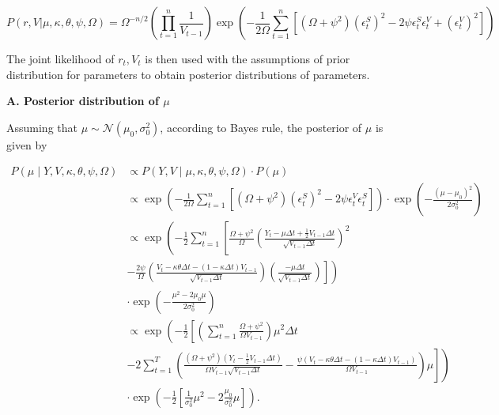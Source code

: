 \documentclass[12pt,a4paper]{article}
\numberwithin{equation}{section}
\begin{document}
\[
P(r, V| \mu, \kappa, \theta, \psi, \Omega) = \Omega^{-n/2} \left( \prod_{t=1}^{n} \frac{1}{V_{t-1}}\right) \exp \left(- \frac{1}{2\Omega} \sum_{t=1}^{n} [(\Omega + \psi^2)(\epsilon_t^S)^2 - 2 \psi \epsilon_t^S \epsilon_t^V + (\epsilon_t^V)^2]\right) \label{eq:3.13}
\]

The joint likelihood of $r_t, V_t$ is then used with the assumptions of prior distribution for parameters to obtain posterior distributions of parameters.

\vspace{1em}

\textbf{A. Posterior distribution of $\mu$}

\vspace{1em}

Assuming that $\mu \sim \mathcal{N}(\mu_0, \sigma_0^2)$, according to Bayes rule, the posterior of $\mu$ is given by

\begin{align*}
P(\mu \mid Y, V, \kappa, \theta, \psi, \Omega) & \propto P(Y, V \mid \mu, \kappa, \theta, \psi, \Omega) \cdot P(\mu) \\[0.6em]
& \propto \exp\left( -\frac{1}{2\Omega} \sum_{t=1}^{n} \left[ (\Omega + \psi^2)(\epsilon_t^S)^2 - 2\psi \epsilon_t^V \epsilon_t^S \right] \right) \cdot \exp\left( -\frac{(\mu - \mu_0)^2}{2\sigma_0^2} \right) \\[0.6em]
& \propto \exp\left( -\frac{1}{2} \sum_{t=1}^{n} \left[ \frac{\Omega + \psi^2}{\Omega} \left( \frac{Y_t - \mu \Delta t + \frac{1}{2} V_{t-1} \Delta t}{\sqrt{V_{t-1} \Delta t}} \right)^2 \right. \right. \\[0.6em]
& \left. \left. - \frac{2\psi}{\Omega} \left( \frac{V_t - \kappa \theta \Delta t - (1 - \kappa \Delta t) V_{t-1}}{\sqrt{V_{t-1} \Delta t}} \right) \left( \frac{-\mu \Delta t}{\sqrt{V_{t-1} \Delta t}} \right) \right] \right) \\[0.6em]
& \cdot \exp\left( -\frac{\mu^2 - 2\mu_0 \mu}{2\sigma_0^2} \right)\\[0.6em]
& \propto\exp\left(-\frac{1}{2} \left[\left(\sum_{t=1}^n \frac{\Omega + \psi^2}{\Omega V_{t-1}}\right) \mu^2 \Delta t \right. \right. \\[0.6em] 
& \left. \left. - 2\sum_{t=1}^T \left(\frac{(\Omega + \psi^2)(Y_t - \frac{1}{2} V_{t-1} \Delta t)}{\Omega V_{t-1} \sqrt{V_{t-1} \Delta t}} - \frac{\psi \left(V_t - \kappa \theta \Delta t - (1 - \kappa \Delta t)V_{t-1} \right)}{\Omega V_{t-1}} \right) \mu \right] \right) \\[0.6em]
& \cdot \exp\left(-\frac{1}{2} \left[\frac{1}{\sigma_0^2} \mu^2 - 2 \frac{\mu_0}{\sigma_0^2} \mu \right] \right).
\end{align*}
\end{document}
